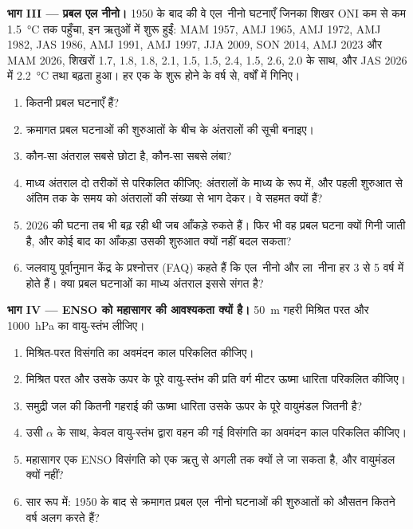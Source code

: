 \begin{problem}[{सप्ताहांत समस्या --- एल नीनो गिनना}]
\medskip\noindent\textbf{भाग III --- प्रबल एल नीनो।}
1950 के बाद की वे एल~नीनो घटनाएँ जिनका शिखर ONI कम से कम \qty{1.5}{\celsius} तक पहुँचा, इन
ऋतुओं में शुरू हुईं: MAM 1957, AMJ 1965, AMJ 1972, AMJ 1982, JAS 1986, AMJ 1991, AMJ 1997, JJA 2009, SON 2014,
AMJ 2023 और MAM 2026, शिखरों 1.7, 1.8, 1.8, 2.1, 1.5, 1.5, 2.4, 1.5, 2.6, 2.0 के साथ, और
JAS 2026 में \qty{2.2}{\celsius} तथा बढ़ता हुआ। हर एक के शुरू होने के वर्ष से, वर्षों में गिनिए।
\begin{enumerate}[resume]
  \item कितनी प्रबल घटनाएँ हैं?
  \item क्रमागत प्रबल घटनाओं की शुरुआतों के बीच के अंतरालों की सूची बनाइए।
  \item कौन-सा अंतराल सबसे छोटा है, कौन-सा सबसे लंबा?
  \item माध्य अंतराल दो तरीकों से परिकलित कीजिए: अंतरालों के माध्य के रूप में, और पहली शुरुआत से अंतिम तक के
        समय को अंतरालों की संख्या से भाग देकर। वे सहमत क्यों हैं?
  \item 2026 की घटना तब भी बढ़ रही थी जब आँकड़े रुकते हैं। फिर भी वह प्रबल घटना
        क्यों गिनी जाती है, और कोई बाद का आँकड़ा उसकी शुरुआत क्यों नहीं बदल सकता?
  \item जलवायु पूर्वानुमान केंद्र के प्रश्नोत्तर (FAQ) कहते हैं कि एल~नीनो और ला~नीना हर 3 से 5
        वर्ष में होते हैं। क्या प्रबल घटनाओं का माध्य अंतराल इससे संगत है?
\end{enumerate}

\medskip\noindent\textbf{भाग IV --- ENSO को महासागर की आवश्यकता क्यों है।}
\qty{50}{m} गहरी मिश्रित परत और \qty{1000}{hPa} का वायु-स्तंभ लीजिए।
\begin{enumerate}[resume]
  \item मिश्रित-परत विसंगति का अवमंदन काल परिकलित कीजिए।
  \item मिश्रित परत और उसके ऊपर के पूरे वायु-स्तंभ की प्रति वर्ग मीटर ऊष्मा धारिता
        परिकलित कीजिए।
  \item समुद्री जल की कितनी गहराई की ऊष्मा धारिता उसके ऊपर के पूरे वायुमंडल जितनी है?
  \item उसी $\alpha$ के साथ, केवल वायु-स्तंभ द्वारा वहन की गई विसंगति का अवमंदन काल परिकलित
        कीजिए।
  \item महासागर एक ENSO विसंगति को एक ऋतु से अगली तक क्यों ले जा सकता है, और वायुमंडल
        क्यों नहीं?
  \item सार रूप में: 1950 के बाद से क्रमागत प्रबल एल~नीनो घटनाओं की शुरुआतों को औसतन कितने वर्ष
        अलग करते हैं?
\end{enumerate}
\end{problem}
